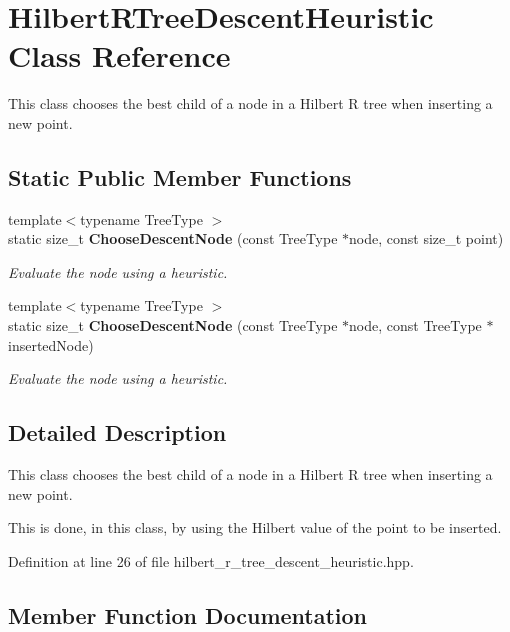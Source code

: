 \section{Hilbert\+R\+Tree\+Descent\+Heuristic Class Reference}
\label{classmlpack_1_1tree_1_1HilbertRTreeDescentHeuristic}


This class chooses the best child of a node in a Hilbert R tree when inserting a new point.  


\subsection*{Static Public Member Functions}
\begin{DoxyCompactItemize}
\item 
{\footnotesize template$<$typename Tree\+Type $>$ }\\static size\+\_\+t \textbf{ Choose\+Descent\+Node} (const Tree\+Type $\ast$node, const size\+\_\+t point)
\begin{DoxyCompactList}\small\item\em Evaluate the node using a heuristic. \end{DoxyCompactList}\item 
{\footnotesize template$<$typename Tree\+Type $>$ }\\static size\+\_\+t \textbf{ Choose\+Descent\+Node} (const Tree\+Type $\ast$node, const Tree\+Type $\ast$inserted\+Node)
\begin{DoxyCompactList}\small\item\em Evaluate the node using a heuristic. \end{DoxyCompactList}\end{DoxyCompactItemize}


\subsection{Detailed Description}
This class chooses the best child of a node in a Hilbert R tree when inserting a new point. 

This is done, in this class, by using the Hilbert value of the point to be inserted. 

Definition at line 26 of file hilbert\+\_\+r\+\_\+tree\+\_\+descent\+\_\+heuristic.\+hpp.



\subsection{Member Function Documentation}
\mbox{\label{classmlpack_1_1tree_1_1HilbertRTreeDescentHeuristic_a8e256767c1051c319d839423802523d5}} 

